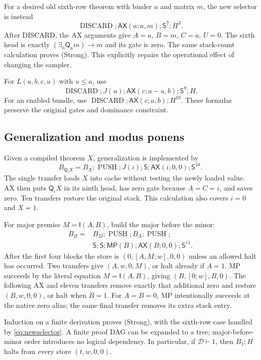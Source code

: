 \documentclass[11pt,a4paper]{article}
\theoremstyle{definition}
\newcommand{\imp}{\mathsf I}
\newcommand{\qnt}{\mathsf Q}
\newcommand{\calD}{\mathcal D}
\newcommand{\AX}{\mathsf{AX}}
\newcommand{\MP}{\mathsf{MP}}
\newcommand{\Tr}{\mathsf S}
\numberwithin{equation}{section}
\begin{document}
For a desired old sixth-row theorem with binder $a$ and matrix $m$,
the new selector is instead
\begin{equation}
 \boxed{\operatorname{DISCARD};\AX(a;a,m);\Tr^7;H^3.}
 \label{eq:newselector}
\end{equation}
After DISCARD, the AX arguments give $A=a$, $B=m$, $C=a$, $U=0$.
The sixth head is exactly $(\exists_a\qnt_a m)\to m$ and its gate is
zero. The same stack-count calculation proves (Strong). This explicitly
repairs the operational effect of changing the sampler.

For $L(a,b,c,u)$ with $u\le a$, use
\[
 \operatorname{DISCARD};J(u);\AX(c;a-u,b);\Tr^9;H.
\]
For an enabled bundle, use
$\operatorname{DISCARD};\AX(c;a,b);H^{10}$. These formulas preserve
the original gates and dominance constraint.

\subsection{Generalization and modus ponens}

Given a compiled theorem $X$, generalization is implemented by
\[
 B_{\qnt_i X}=B_X;\operatorname{PUSH};J(i);\Tr;
                    \AX(i;0,0);\Tr^{10}.
\]
The single transfer loads $X$ into cache without testing the newly
loaded value. AX then puts $\qnt_i X$ in its ninth head, has zero gate
because $A=C=i$, and saves zero. Ten transfers restore the original
stack. This calculation also covers $i=0$ and $X=1$.

For major premise $M=\imp(A,B)$, build the major before the minor:
\[
\begin{split}
 B_B={}&B_M;\operatorname{PUSH};B_A;\operatorname{PUSH};\\
       &\Tr;\Tr;\MP(B);\AX(B;0,0);\Tr^{11}.
\end{split}
\]
After the first four blocks the store is $(0,[A,M;w],0,0)$ unless an
allowed halt has occurred. Two transfers give $(A,w,0,M)$, or halt
already if $A=1$. MP succeeds by the literal equation $M=\imp(A,B)$,
giving $(B,[0;w],B,0)$. The following AX and eleven transfers remove
exactly that additional zero and restore $(B,w,0,0)$, or halt when
$B=1$. For $A=B=0$, MP intentionally succeeds at the native zero alias;
the same final transfer removes its extra stack entry.

Induction on a finite derivation proves (Strong), with the sixth-row
case handled by \eqref{eq:newselector}. A finite proof DAG can be
expanded to a tree; major-before-minor order introduces no logical
dependency. In particular, if $\calD\vdash1$, then $B_1;H$ halts from
every store $(t,w,0,0)$.
\end{document}
